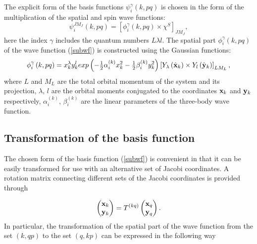 \documentclass[12pt,a4paper,twoside]{article}
\begin{document}
The explicit form of the basis functions $ \psi_{i}^{\gamma} \left(k, pq \right) $ is chosen in the form of the multiplication of the spatial and spin wave functions:
\begin{equation}
\psi_{i}^{JM_J}\left(k, pq \right) = \left[ \phi_{i}^{\gamma} \left(k, pq \right) 
\times \chi^{S} \right] _{JM_{J}},
\label{subwf}
\end{equation}
here the index $\gamma$ includes the quantum numbers $L \lambda l$. The spatial part $\phi_{i}^{\gamma} \left(k, pq \right) $ of the wave function (\ref {subwf}) is constructed using the Gaussian functions:
 \begin{equation}
 \phi_{i}^{\gamma} \left(k, pq \right) =
 x_{k}^{\lambda} y_{k}^{l} exp\left(- \tfrac{1}{2}\alpha^{(k)}_{i} x_{k}^{2} - \tfrac{1}{2} \beta^{(k)}_{i}  y_{k}^{2} \right) 
 \left[ Y_\lambda \left(  \hat{ \bf x}_k \right) \times Y_l \left( \hat{\bf y}_k \right) \right]_{LM_L},
 \label{radial_wf}
 \end{equation}
where $ L $ and $ M_L $ are the total orbital momentum of the system and its projection, $ \lambda $, $ l $ are the orbital moments conjugated to the coordinates $ {\bf x} _k $ and $ {\bf y} _k $ respectively, $ \alpha^{(k)} _ {i} $, $ \beta^{(k)}_{i}$ are the linear parameters of the three-body wave function.
 \subsection{Transformation of the basis function }
 The chosen form of the basis function (\ref{subwf}) is convenient in that it can be easily transformed for use with an alternative set of Jacobi coordinates. A rotation matrix connecting different sets of the Jacobi coordinates is provided through
 
\begin{equation}
\begin{pmatrix}
{\bf x}_k \\ 
{\bf y}_k
\end{pmatrix}  = T^{(kq)}
\begin{pmatrix}
{\bf x}_q \\ 
{\bf y}_q
\end{pmatrix}.
\end{equation}
 In particular, the transformation of the spatial part of the wave function from the set $ \left(k, qp \right) $ to the set $ \left(q, kp \right) $ can be expressed in the following way
\end{document}
